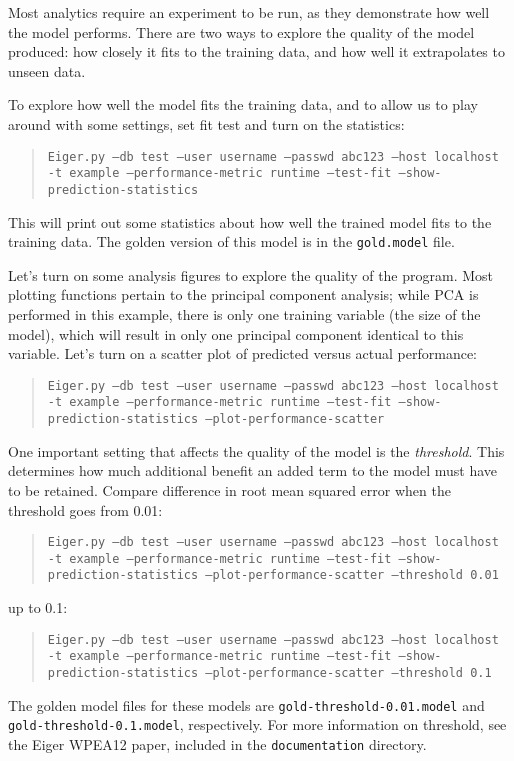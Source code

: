 Most analytics require an experiment to be run, as they demonstrate how well the model performs. There are two ways to explore the quality of the model produced: how closely it fits to the training data, and how well it extrapolates to unseen data.

To explore how well the model fits the training data, and to allow us to play around with some settings, set fit test and turn on the statistics:
	\begin{quote}
	\texttt{Eiger.py --db test --user username --passwd abc123 --host localhost 
                     -t example --performance-metric runtime
                     --test-fit --show-prediction-statistics}
	\end{quote}
This will print out some statistics about how well the trained model fits to the training data. The golden version of this model is in the \texttt{gold.model} file.

Let's turn on some analysis figures to explore the quality of the program. Most plotting functions pertain to the principal component analysis; while PCA is performed in this example, there is only one training variable (the size of the model), which will result in only one principal component identical to this variable. Let's turn on a scatter plot of predicted versus actual performance:
	\begin{quote}
	\texttt{Eiger.py --db test --user username --passwd abc123 --host localhost 
                     -t example --performance-metric runtime
                     --test-fit --show-prediction-statistics
                     --plot-performance-scatter}
	\end{quote}

One important setting that affects the quality of the model is the {\em threshold}. This determines how much additional benefit an added term to the model must have to be retained. Compare difference in root mean squared error when the threshold goes from 0.01:
	\begin{quote}
	\texttt{Eiger.py --db test --user username --passwd abc123 --host localhost 
                     -t example --performance-metric runtime
                     --test-fit --show-prediction-statistics
                     --plot-performance-scatter
                     --threshold 0.01}
	\end{quote}
up to 0.1:
	\begin{quote}
	\texttt{Eiger.py --db test --user username --passwd abc123 --host localhost 
                     -t example --performance-metric runtime
                     --test-fit --show-prediction-statistics
                     --plot-performance-scatter
                     --threshold 0.1}
	\end{quote}
The golden model files for these models are \texttt{gold-threshold-0.01.model} and \texttt{gold-threshold-0.1.model}, respectively. For more information on threshold, see the Eiger WPEA12 paper, included in the \texttt{documentation} directory.

